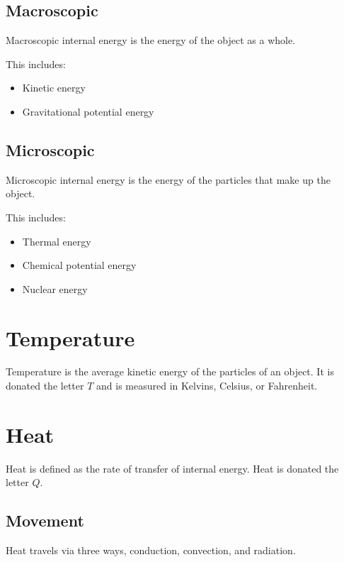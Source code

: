 \documentclass{book}
\newenvironment{generalInformation}{}{}
\begin{document}
\subsection{Macroscopic}
\begin{generalInformation}
    Macroscopic internal energy is the energy of the object as a whole.

    This includes:
    \begin{itemize}
        \item Kinetic energy
        \item Gravitational potential energy
    \end{itemize}
\end{generalInformation}

\subsection{Microscopic}
\begin{generalInformation}
    Microscopic internal energy is the energy of the particles that make up the object.

    This includes:
    \begin{itemize}
        \item Thermal energy
        \item Chemical potential energy
        \item Nuclear energy
    \end{itemize}
\end{generalInformation}


\section{Temperature}
\begin{generalInformation}
    Temperature is the average kinetic energy of the particles of an object.  It is donated the letter $T$ and is measured in Kelvins, Celsius, or Fahrenheit.
\end{generalInformation}

\section{Heat}
\begin{generalInformation}
    Heat is defined as the rate of transfer of internal energy.  Heat is donated the letter $Q$.
\end{generalInformation}
\subsection{Movement}
\begin{generalInformation}
    Heat travels via three ways, conduction, convection, and radiation.
\end{generalInformation}
\end{document}
